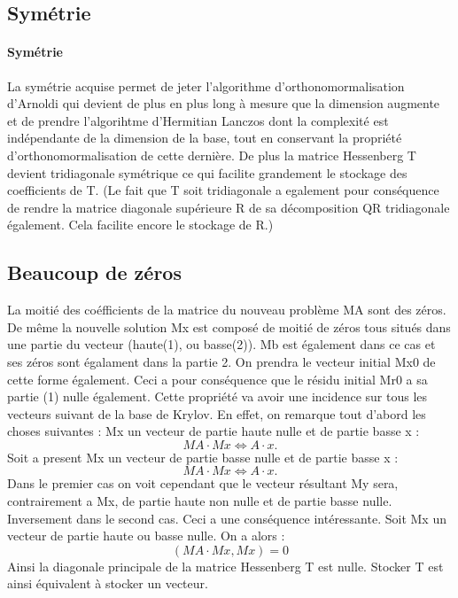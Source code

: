 \documentclass[12 pt]{article}
\begin{document}
\subsection*{Symétrie}

\paragraph*{Symétrie}{}

La symétrie acquise permet de jeter l'algorithme d'orthonomormalisation d'Arnoldi qui devient de plus en plus long à mesure
que la dimension augmente et de prendre l'algorihtme d'Hermitian Lanczos dont
la complexité est indépendante de la dimension de la base, tout en conservant la propriété d'orthonomormalisation de cette dernière.
De plus la matrice Hessenberg T devient tridiagonale symétrique ce qui facilite grandement le stockage des coefficients de T. (Le fait que T soit tridiagonale a egalement pour conséquence de rendre la matrice diagonale supérieure R de sa décomposition QR tridiagonale également. Cela facilite encore le stockage de R.)

\subsection*{Beaucoup de zéros}

La moitié des coéfficients de la matrice du nouveau problème MA sont des zéros. De même la nouvelle solution Mx est composé de moitié de zéros tous situés dans une partie du vecteur (haute(1), ou basse(2)). Mb est également dans ce cas et ses zéros sont égalament dans la partie 2. On prendra le vecteur initial Mx0 de cette forme également. 
Ceci a pour conséquence que le résidu initial Mr0 a sa partie (1) nulle également. Cette propriété va avoir une incidence sur tous les vecteurs suivant de la base de Krylov. 
En effet, on remarque tout d'abord les choses suivantes : 
Mx un vecteur de partie haute nulle et de partie basse x  :
 \[ MA \cdot Mx \Leftrightarrow A \cdot x. \] 
Soit a present Mx un vecteur de partie basse nulle et de partie basse x : 
\[  MA \cdot Mx \Leftrightarrow A \cdot x. \]
 Dans le premier cas on voit cependant que le vecteur résultant My sera, contrairement a Mx, de partie haute non nulle et de partie basse nulle. 
 Inversement dans le second cas. 
 Ceci a une conséquence intéressante. Soit Mx un vecteur de partie haute ou basse nulle. On a alors :
\[  (MA\cdot Mx,Mx) = 0   \]
 Ainsi la diagonale principale de la matrice Hessenberg T est nulle. Stocker T est ainsi équivalent à stocker un vecteur.  
\end{document}
